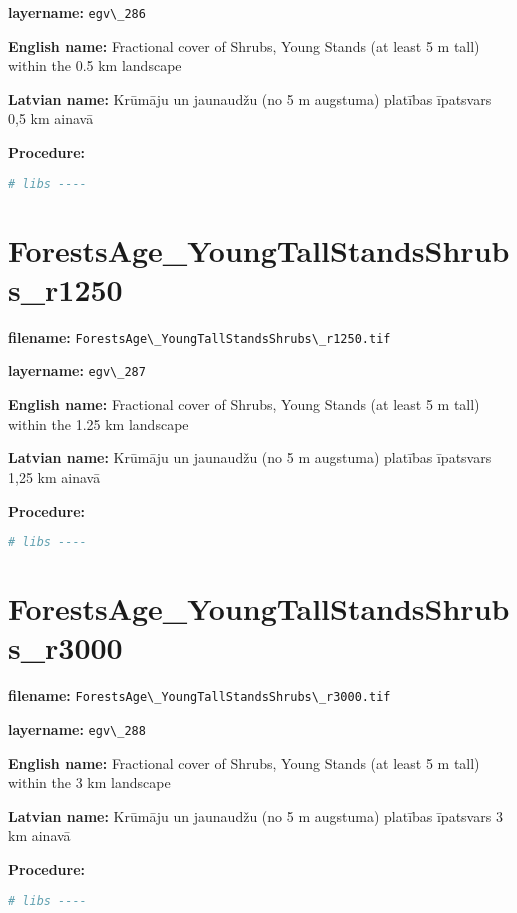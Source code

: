 \documentclass[
]{book}
\newcommand{\passthrough}[1]{#1}
\begin{document}
\textbf{layername:} \passthrough{\lstinline!egv\_286!}

\textbf{English name:} Fractional cover of Shrubs, Young Stands (at least 5 m tall) within the 0.5 km landscape

\textbf{Latvian name:} Krūmāju un jaunaudžu (no 5 m augstuma) platības īpatsvars 0,5 km ainavā

\textbf{Procedure:}

\begin{lstlisting}[language=R]
# libs ----
\end{lstlisting}

\section{ForestsAge\_YoungTallStandsShrubs\_r1250}\label{ch06.287}

\textbf{filename:} \passthrough{\lstinline!ForestsAge\_YoungTallStandsShrubs\_r1250.tif!}

\textbf{layername:} \passthrough{\lstinline!egv\_287!}

\textbf{English name:} Fractional cover of Shrubs, Young Stands (at least 5 m tall) within the 1.25 km landscape

\textbf{Latvian name:} Krūmāju un jaunaudžu (no 5 m augstuma) platības īpatsvars 1,25 km ainavā

\textbf{Procedure:}

\begin{lstlisting}[language=R]
# libs ----
\end{lstlisting}

\section{ForestsAge\_YoungTallStandsShrubs\_r3000}\label{ch06.288}

\textbf{filename:} \passthrough{\lstinline!ForestsAge\_YoungTallStandsShrubs\_r3000.tif!}

\textbf{layername:} \passthrough{\lstinline!egv\_288!}

\textbf{English name:} Fractional cover of Shrubs, Young Stands (at least 5 m tall) within the 3 km landscape

\textbf{Latvian name:} Krūmāju un jaunaudžu (no 5 m augstuma) platības īpatsvars 3 km ainavā

\textbf{Procedure:}

\begin{lstlisting}[language=R]
# libs ----
\end{lstlisting}
\end{document}
